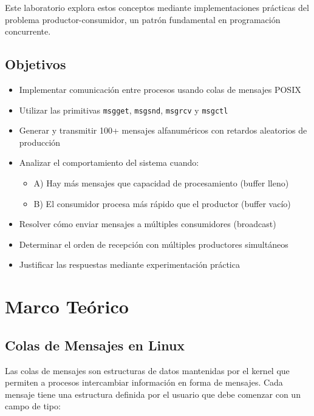 \documentclass[10pt]{article}
\begin{document}
Este laboratorio explora estos conceptos mediante implementaciones prácticas del problema productor-consumidor, un patrón fundamental en programación concurrente.

\subsection{Objetivos}
\begin{itemize}
  \item Implementar comunicación entre procesos usando colas de mensajes POSIX
  \item Utilizar las primitivas \texttt{msgget}, \texttt{msgsnd}, \texttt{msgrcv} y \texttt{msgctl}
  \item Generar y transmitir 100+ mensajes alfanuméricos con retardos aleatorios de producción
  \item Analizar el comportamiento del sistema cuando:
  \begin{itemize}
    \item A) Hay más mensajes que capacidad de procesamiento (buffer lleno)
    \item B) El consumidor procesa más rápido que el productor (buffer vacío)
  \end{itemize}
  \item Resolver cómo enviar mensajes a múltiples consumidores (broadcast)
  \item Determinar el orden de recepción con múltiples productores simultáneos
  \item Justificar las respuestas mediante experimentación práctica
\end{itemize}

\clearpage

\section{Marco Teórico}

\subsection{Colas de Mensajes en Linux}
Las colas de mensajes son estructuras de datos mantenidas por el kernel que permiten a procesos intercambiar información en forma de mensajes. Cada mensaje tiene una estructura definida por el usuario que debe comenzar con un campo de tipo:
\end{document}
